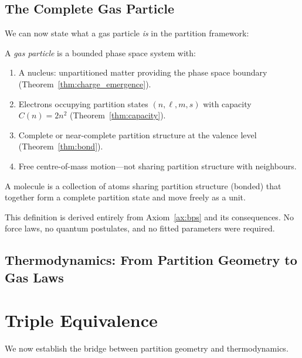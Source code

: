 \subsection{The Complete Gas Particle}

We can now state what a gas particle \emph{is} in the partition framework:

\begin{definition}
\label{def:gas_particle}
A \emph{gas particle} is a bounded phase space system with:
\begin{enumerate}
    \item A nucleus: unpartitioned matter providing the phase space boundary (Theorem~\ref{thm:charge_emergence}).
    \item Electrons occupying partition states $(n, \ell, m, s)$ with capacity $C(n) = 2n^2$ (Theorem~\ref{thm:capacity}).
    \item Complete or near-complete partition structure at the valence level (Theorem~\ref{thm:bond}).
    \item Free centre-of-mass motion---not sharing partition structure with neighbours.
\end{enumerate}
A molecule is a collection of atoms sharing partition structure (bonded) that together form a complete partition state and move freely as a unit.
\end{definition}

This definition is derived entirely from Axiom~\ref{ax:bps} and its consequences. No force laws, no quantum postulates, and no fitted parameters were required.


\subsection{Thermodynamics: From Partition Geometry to Gas Laws}
\label{part:thermo}

\section{Triple Equivalence}
\label{sec:triple}

We now establish the bridge between partition geometry and thermodynamics.

